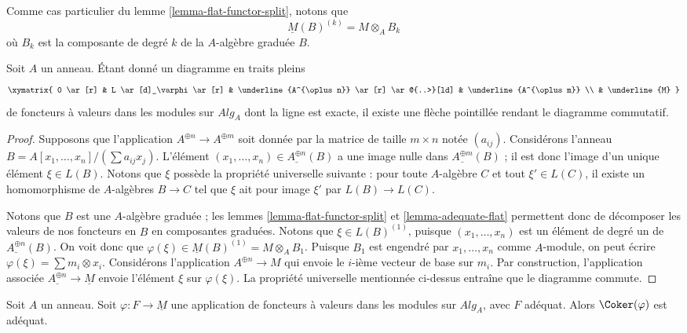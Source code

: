 \noindent
Comme cas particulier du
lemme \ref{lemma-flat-functor-split},
notons que
$$
\underline{M}(B)^{(k)} = M \otimes_A B_k
$$
où $B_k$ est la composante de degré $k$ de la $A$-algèbre graduée $B$.

\begin{lemma}
\label{lemma-lift-map}
Soit $A$ un anneau. Étant donné un diagramme en traits pleins
$$
\xymatrix{
0 \ar[r] &
L \ar[d]_\varphi \ar[r] &
\underline{A^{\oplus n}} \ar[r] \ar@{..>}[ld] &
\underline{A^{\oplus m}} \\
& \underline{M}
}
$$
de foncteurs à valeurs dans les modules sur $\textit{Alg}_A$
dont la ligne est exacte, il existe une flèche pointillée rendant le diagramme commutatif.
\end{lemma}

\begin{proof}
Supposons que l'application $A^{\oplus n} \to A^{\oplus m}$ soit donnée par la
matrice de taille $m \times n$ notée $(a_{ij})$. Considérons l'anneau
$B = A[x_1, \ldots, x_n]/(\sum a_{ij}x_j)$. L'élément
$(x_1, \ldots, x_n) \in \underline{A^{\oplus n}}(B)$ a une image nulle dans
$\underline{A^{\oplus m}}(B)$ ; il est donc l'image d'un unique élément
$\xi \in L(B)$. Notons que $\xi$ possède la propriété universelle suivante :
pour toute $A$-algèbre $C$ et tout $\xi' \in L(C)$, il existe un homomorphisme de
$A$-algèbres $B \to C$ tel que $\xi$ ait pour image $\xi'$ par $L(B) \to L(C)$.

\medskip\noindent
Notons que $B$ est une $A$-algèbre graduée ; les
lemmes \ref{lemma-flat-functor-split} et \ref{lemma-adequate-flat}
permettent donc de décomposer les valeurs de nos foncteurs en $B$ en composantes graduées.
Notons que $\xi \in L(B)^{(1)}$, puisque $(x_1, \ldots, x_n)$ est un élément
de degré un de $\underline{A^{\oplus n}}(B)$. On voit donc que
$\varphi(\xi) \in \underline{M}(B)^{(1)} = M \otimes_A B_1$.
Puisque $B_1$ est engendré par $x_1, \ldots, x_n$ comme $A$-module,
on peut écrire $\varphi(\xi) = \sum m_i \otimes x_i$. Considérons l'application
$A^{\oplus n} \to M$ qui envoie le $i$-ième vecteur de base sur $m_i$.
Par construction, l'application associée
$\underline{A^{\oplus n}} \to \underline{M}$
envoie l'élément $\xi$ sur $\varphi(\xi)$. La propriété
universelle mentionnée ci-dessus entraîne que le diagramme commute.
\end{proof}

\begin{lemma}
\label{lemma-cokernel-into-module}
Soit $A$ un anneau.
Soit $\varphi : F \to \underline{M}$ une application de foncteurs à valeurs dans les modules
sur $\textit{Alg}_A$, avec $F$ adéquat.
Alors $\Coker(\varphi)$ est adéquat.
\end{lemma}

